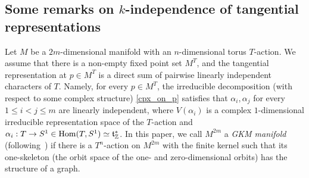 \documentclass{amsart}
\theoremstyle{definition}
\theoremstyle{remark}
\numberwithin{equation}{section}
\begin{document}
\subsection{Some remarks on $k$-independence of tangential representations}
\label{sect:2.1}

Let $M$ be a $2m$-dimensional manifold with an $n$-dimensional torus $T$-action.
We assume that there is a non-empty fixed point set $M^{T}$, and the tangential representation at $p\in M^{T}$ is a direct sum of pairwise linearly independent characters of $T$.
Namely, for every $p\in M^{T}$, the irreducible decomposition (with respect to some complex structure) \eqref{cpx_on_p}
satisfies that $\alpha_{i}, \alpha_{j}$ for every $1\le i<j\le m$ are linearly independent,
where $V(\alpha_{i})$ is a complex $1$-dimensional irreducible representation space of the $T$-action and $\alpha_{i}:T\to S^{1}\in {\rm Hom}(T,S^{1}) \simeq \mathfrak{t}_{\mathbb{Z}}^{*}$. 
In this paper, we call $M^{2m}$  a {\it GKM manifold} (following~\cite{GZ}) if there is a $T^{n}$-action on $M^{2m}$ with the finite kernel such that its one-skeleton (the orbit space of the one- and zero-dimensional orbits) has the structure of a graph.
\end{document}
